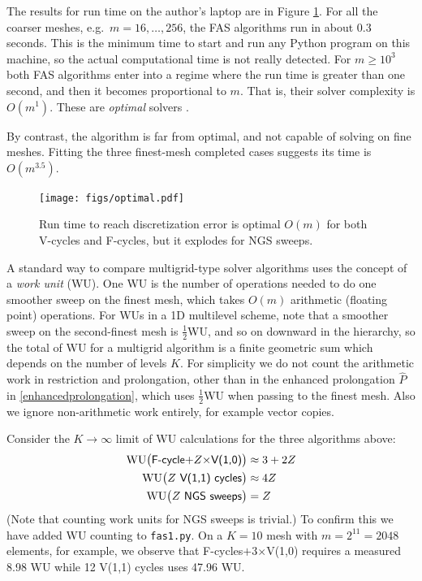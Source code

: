 \documentclass[letterpaper,final,12pt,reqno]{amsart}
\begin{document}
The results for run time on the author's laptop are in Figure \ref{fig:optimal}.  For all the coarser meshes, e.g.~$m=16,\dots,256$, the FAS algorithms run in about 0.3 seconds.  This is the minimum time to start and run any Python program on this machine, so the actual computational time is not really detected.  For $m \ge 10^3$ both FAS algorithms enter into a regime where the run time is greater than one second, and then it becomes proportional to $m$.  That is, their solver complexity is $O(m^1)$.  These are \emph{optimal} solvers \cite[Chapter 7]{Bueler2021}.

By contrast, the  algorithm is far from optimal, and not capable of solving on fine meshes.  Fitting the three finest-mesh completed cases suggests its time is $O(m^{3.5})$.

\begin{figure}
\texttt{[image: figs/optimal.pdf]}
\caption{Run time to reach discretization error is optimal $O(m)$ for both V-cycles and F-cycles, but it explodes for NGS sweeps.}
\label{fig:optimal}
\end{figure}

A standard way to compare multigrid-type solver algorithms uses the concept of a \emph{work unit} (WU).  One WU is the number of operations needed to do one smoother sweep on the finest mesh, which takes $O(m)$ arithmetic (floating point) operations.  For WUs in a 1D multilevel scheme, note that a smoother sweep on the second-finest mesh is $\frac{1}{2}$WU, and so on downward in the hierarchy, so the total of WU for a multigrid algorithm is a finite geometric sum \cite{Briggsetal2000} which depends on the number of levels $K$.  For simplicity we do not count the arithmetic work in restriction and prolongation, other than in the enhanced prolongation $\hat P$ in \eqref{enhancedprolongation}, which uses $\frac{1}{2}$WU when passing to the finest mesh.  Also we ignore non-arithmetic work entirely, for example vector copies.

Consider the $K\to\infty$ limit of WU calculations for the three algorithms above:
\begin{align*}
\text{WU}\big(\text{\textsf{F-cycle$+Z\times$V(1,0)}}\big) &\approx 3+2Z \\
\text{WU}\big(\text{\textsf{$Z$ V(1,1) cycles}}\big)   &\approx 4Z \\
\text{WU}\big(\text{\textsf{$Z$ NGS sweeps}}\big)      &= Z
\end{align*}
(Note that counting work units for NGS sweeps is trivial.)  To confirm this we have added WU counting to \texttt{fas1.py}.  On a $K=10$ mesh with $m=2^{11}=2048$ elements, for example, we observe that \textsf{F-cycles$+$3$\times$V(1,0)} requires a measured 8.98 WU while \textsf{12 V(1,1) cycles} uses 47.96 WU.
\end{document}
